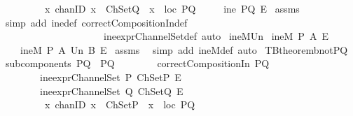 \begin{isabellebody}
\ \ \ \ \ \ \ \ {\isachardoublequoteopen}{\isasymforall}\ {\isacharparenleft}x\ {\isacharcolon}{\isacharcolon}chanID{\isacharparenright}{\isachardot}\ {\isacharparenleft}{\isacharparenleft}x\ {\isasymin}\ ChSetQ{\isacharparenright}\ {\isasymlongrightarrow}\ {\isacharparenleft}x\ {\isasymin}\ {\isacharparenleft}loc\ PQ{\isacharparenright}{\isacharparenright}{\isacharparenright}{\isachardoublequoteclose}\isanewline
{}\ \ \ \ {\isachardoublequoteopen}{\isasymnot}\ ine\ PQ\ E{\isachardoublequoteclose}\isanewline
%
\isadelimproof
%
\endisadelimproof
%
\isatagproof
{}\isamarkupfalse%
\ assms\ \isanewline
{}\isamarkupfalse%
\ {\isacharparenleft}simp\ add{\isacharcolon}\ ine{\isacharunderscore}def\ correctCompositionIn{\isacharunderscore}def\ \isanewline
\ \ \ \ \ \ \ \ \ \ \ \ \ \ \ \ \ \ \ \ \ ine{\isacharunderscore}exprChannelSet{\isacharunderscore}def{\isacharcomma}\ auto{\isacharparenright}%
\endisatagproof
{\isafoldproof}%
%
\isadelimproof
\isanewline
%
\endisadelimproof
\isanewline
{}\isamarkupfalse%
\ ineM{\isacharunderscore}Un{}{\isacharcolon}\isanewline
{}\ {\isachardoublequoteopen}ineM\ P\ A\ E{\isachardoublequoteclose}\isanewline
{}\ \ \ \ {\isachardoublequoteopen}ineM\ P\ {\isacharparenleft}A\ Un\ B{\isacharparenright}\ E{\isachardoublequoteclose}\isanewline
%
\isadelimproof
%
\endisadelimproof
%
\isatagproof
{}\isamarkupfalse%
\ assms\ \isamarkupfalse%
\ {\isacharparenleft}simp\ add{\isacharcolon}\ ineM{\isacharunderscore}def{\isacharcomma}\ auto{\isacharparenright}%
\endisatagproof
{\isafoldproof}%
%
\isadelimproof
\isanewline
%
\endisadelimproof
\isanewline
{}\isamarkupfalse%
\ TBtheorem{}b{\isacharunderscore}notPQ{\isacharcolon}\isanewline
{}\ {\isachardoublequoteopen}subcomponents\ PQ\ {\isacharequal}\ {\isacharbraceleft}P{\isacharcomma}Q{\isacharbraceright}{\isachardoublequoteclose}\isanewline
\ \ \ \ \ \ \ \ {\isachardoublequoteopen}correctCompositionIn\ PQ{\isachardoublequoteclose}\ \isanewline
\ \ \ \ \ \ \ \ {\isachardoublequoteopen}ine{\isacharunderscore}exprChannelSet\ P\ ChSetP\ E{\isachardoublequoteclose}\isanewline
\ \ \ \ \ \ \ \ {\isachardoublequoteopen}ine{\isacharunderscore}exprChannelSet\ Q\ ChSetQ\ E{\isachardoublequoteclose}\isanewline
\ \ \ \ \ \ \ \ {\isachardoublequoteopen}{\isasymforall}\ {\isacharparenleft}x\ {\isacharcolon}{\isacharcolon}chanID{\isacharparenright}{\isachardot}\ {\isacharparenleft}{\isacharparenleft}x\ {\isasymin}\ ChSetP{\isacharparenright}\ {\isasymlongrightarrow}\ {\isacharparenleft}x\ {\isasymin}\ {\isacharparenleft}loc\ PQ{\isacharparenright}{\isacharparenright}{\isacharparenright}{\isachardoublequoteclose}\isanewline

\end{isabellebody}
